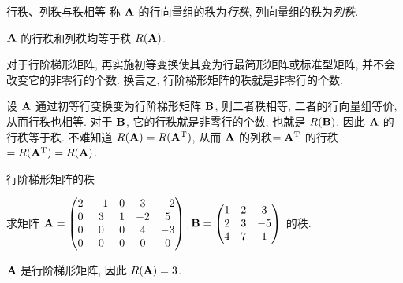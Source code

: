 \begin{frame}{行秩、列秩与秩相等}
	\onslide<+->
	称 ${\mathbf{A}}$ 的行向量组的秩为\emph{行秩}, 列向量组的秩为\emph{列秩}.
	\onslide<+->
	\begin{theorem}
		${\mathbf{A}}$ 的行秩和列秩均等于秩 $R({\mathbf{A}})$.
	\end{theorem}
	\onslide<+->
	对于行阶梯形矩阵, 再实施初等变换使其变为行最简形矩阵或标准型矩阵, 并不会改变它的非零行的个数.
	\onslide<+->
	换言之, \alert{行阶梯形矩阵的秩就是非零行的个数}.

	\onslide<+->
	设 ${\mathbf{A}}$ 通过初等行变换变为行阶梯形矩阵 ${\mathbf{B}}$, 则二者秩相等, 二者的行向量组等价, 从而行秩也相等.
	\onslide<+->
	对于 ${\mathbf{B}}$, 它的行秩就是非零行的个数, 也就是 $R({\mathbf{B}})$.
	\onslide<+->
	因此 ${\mathbf{A}}$ 的行秩等于秩.
	\onslide<+->
	不难知道 $R({\mathbf{A}})=R({\mathbf{A}}^{\mathrm{T}})$,
	从而 ${\mathbf{A}}$ 的列秩$={\mathbf{A}}^{\mathrm{T}}$ 的行秩$=R({\mathbf{A}}^{\mathrm{T}})=R({\mathbf{A}})$.
\end{frame}


\begin{frame}{行阶梯形矩阵的秩}

	\onslide<+->
	\begin{example}
		求矩阵 ${\mathbf{A}}=\begin{pmatrix}
			2&-1&0&3&-2\\
			0&3&1&-2&5\\
			0&0&0&4&-3\\
			0&0&0&0&0
		\end{pmatrix},{\mathbf{B}}=\begin{pmatrix}
			1&2&3\\
			2&3&-5\\
			4&7&1
		\end{pmatrix}$ 的秩.
	\end{example}
	\onslide<+->
	\begin{solution}
		${\mathbf{A}}$ 是行阶梯形矩阵, 因此 $R({\mathbf{A}})=3$.
		\onslide<+->{\[\bfB\wsim{r_2-2r_1}{r_4-4r_1}\begin{pmatrix}
			1&2&3\\
			0&-1&-11\\
			0&-1&-11
		\end{pmatrix}\wsim{r_3-r_2}{-r_2}\begin{pmatrix}
			1&2&3\\
			0&1&11\\
			0&0&0
		\end{pmatrix}\visible<+->{\implies R(\bfB)=2.}\]}
		\vspace{-\baselineskip}
	\end{solution}
\end{frame}



